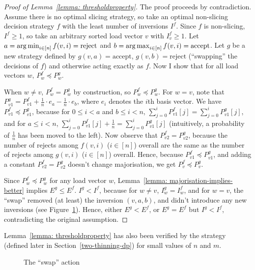 \begin{proof} [Proof of Lemma~\ref{lemma: thresholdproperty}]
    The proof proceeds by contradiction. Assume there is no optimal slicing strategy, so take an optimal non-slicing decision strategy $f$ with the least number of inversions $I^f$. Since $f$ is non-slicing, $I^f\geq 1$, so take an arbitrary sorted load vector $v$ with $I^f_v\geq 1$. Let $a=\operatorname*{arg\,min}_{i\in [n]} f(v,i)=\mathrm{reject}$ and $b=\operatorname*{arg\,max}_{i\in [n]} f(v,i)=\mathrm{accept}$. Let $g$ be a new strategy defined by $g(v,a)=\mathrm{accept}$, $g(v,b)=\mathrm{reject}$ (``swapping'' the decisions of $f$) and otherwise acting exactly as $f$. Now I show that for all load vectors $w$, $P^f_w\preccurlyeq P^g_w$.
    
    When $w\neq v$, $P^f_w = P^g_w$ by construction, so $P^f_w\preccurlyeq P^g_w$. For $w=v$, note that $P^g_{v1}=P^f_{v1}+\frac{1}{n}\cdot e_a-\frac{1}{n}\cdot e_b$, where $e_i$ denotes the $i$th basis vector. We have $P^f_{v1}\preccurlyeq P^g_{v1}$, because for $0\leq i<a$ and $b\leq i<n$, $\sum_{j=0}^i P^f_{v1}[j] = \sum_{j=0}^i P^g_{v1}[j]$, and for $a\leq i<n$, $\sum_{j=0}^i P^f_{v1}[j] + \frac{1}{n} = \sum_{j=0}^i P^g_{v1}[j]$ (intuitively, a probability of $\frac{1}{n}$ has been moved to the left). Now observe that $P^f_{v2}=P^g_{v2}$, because the number of rejects among $f(v,i)$ ($i\in [n]$) overall are the same as the number of rejects among $g(v,i)$ ($i\in [n]$) overall. Hence, because $P^f_{v1}\preccurlyeq P^g_{v1}$, and adding a constant $P^f_{v2}=P^g_{v2}$ doesn't change majorisation, we get $P^f_v \preccurlyeq P^g_v$.
    
    
    Since $P^f_w\preccurlyeq P^g_w$ for any load vector $w$, Lemma~\ref{lemma: majorisation-implies-better} implies $E^g\leq E^f$. $I^g<I^f$, because for $w\neq v$, $I^g_w=I^f_w$, and for $w=v$, the ``swap'' removed (at least) the inversion $(v,a,b)$, and didn't introduce any new inversions (see Figure~\ref{swap-action}). Hence, either $E^g<E^f$, or $E^g=E^f$ but $I^g<I^f$, contradicting the original assumption.
\end{proof}


\begin{remark}
Lemma~\ref{lemma: thresholdproperty} has also been verified by the \DP strategy (defined later in Section~\ref{two-thinning-dp}) for small values of $n$ and $m$.
\end{remark}



\begin{figure}
    \centering
    \caption{The ``swap'' action}
    \label{swap-action}
\end{figure}


